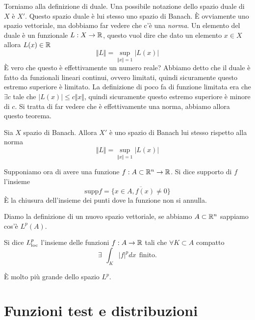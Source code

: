 Torniamo alla definizione di duale. Una possibile notazione dello spazio duale di $X$ è $X'$. Questo spazio duale è lui stesso uno spazio di Banach. È ovviamente uno spazio vettoriale, ma dobbiamo far vedere che c'è una \textit{norma}. Un elemento del duale è un funzionale $L: X\rightarrow \mathbb{R}$, questo vuol dire che dato un elemento $x\in X$ allora $L(x) \in \mathbb{R}$
\begin{equation*}
\Vert L \Vert = \sup_{ \Vert x \Vert = 1}| L(x)|
\end{equation*}
È vero che questo è effettivamente un numero reale? Abbiamo detto che il duale è fatto da funzionali lineari continui, ovvero limitati, quindi sicuramente questo estremo superiore è limitato. La definizione di poco fa di funzione limitata era che $\exists c$ tale che $| L(x)| \leq c \Vert x \Vert $, quindi sicuramente questo estremo superiore è minore di $c$. Si tratta di far vedere che è effettivamente una norma, abbiamo allora questo teorema.
\begin{thm}
Sia $X$ spazio di Banach. Allora $X'$ è uno spazio di Banach lui stesso rispetto alla norma
\begin{equation*}
\Vert L \Vert = \sup_{ \Vert x \Vert = 1}| L(x)|
\end{equation*}
\end{thm}
\begin{defn}
Supponiamo ora di avere una funzione $f: A\subset \mathbb{R}^{n}\rightarrow \mathbb{R}$. Si dice supporto di $f$ l'insieme
\begin{equation*}
\mathrm{supp} f = \overline{\{x\in A, f(x) \neq 0\}}
\end{equation*}
È la chiusura dell'insieme dei punti dove la funzione non si annulla.
\end{defn}
Diamo la definizione di un nuovo spazio vettoriale, se abbiamo $A\subset \mathbb{R}^{n}$ sappiamo cos'è $L^{p}(A)$.
\begin{defn}
Si dice $L^{p}_{\operatorname{loc}}$ l'insieme delle funzioni $f: A\rightarrow \mathbb{R}$ tali che $\forall K\subset A$ compatto
\begin{equation*}
\exists \ \ \int_{K}| f|^{p} dx\ \ \text{finito} .
\end{equation*}
\end{defn}
È molto più grande dello spazio $L^{p}$.

\section{Funzioni test e distribuzioni}

